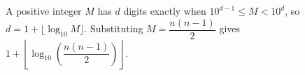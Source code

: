 A positive integer $M$ has $d$ digits exactly when $10^{d-1}\le M<10^d$, so $d=1+\lfloor\log_{10}M\rfloor$. Substituting $M=\dfrac{n(n-1)}{2}$ gives $\boxed{1+\left\lfloor\log_{10}\left(\dfrac{n(n-1)}{2}\right)\right\rfloor}$.
